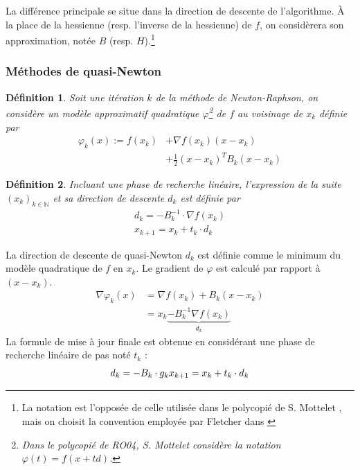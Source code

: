 \documentclass[3p, twocolumn]{elsarticle}
\newtheorem{definition}{Définition}[section]
\begin{document}
La différence principale se situe dans la direction de descente de l'algorithme. \`A la place de la hessienne (resp. l'inverse de la hessienne) de $f$, on considèrera son approximation, notée $B$ (resp. $H$).\footnote{La notation est l'opposée de celle utilisée dans le polycopié de S. Mottelet \cite{poly:mottelet2003}, mais on choisit la convention employée par Fletcher dans \cite{book:Fletcher_1987}}

\subsubsection{Méthodes de quasi-Newton}
\begin{definition}
    Soit une itération $k$ de la méthode de Newton-Raphson, on considère un modèle approximatif quadratique $\varphi$\footnote{Dans le polycopié de RO04, S. Mottelet \cite{poly:mottelet2003} considère la notation $\varphi(t) = f(x+td)$.} de $f$ au voisinage de $x_{k}$ définie par
    \begin{align}
        \varphi_k(x) := f(x_k) & + \nabla f(x_k) (x - x_k)\nonumber \\
                               & + \frac12 (x-x_k)^T B_k (x-x_k)
        \label{eq:modele-quadra-qn}
    \end{align}
\end{definition}

\begin{definition}
    Incluant une phase de recherche linéaire, l'expression de la suite $(x_k)_{k\in \mathbb{N}}$ et sa direction de descente $d_k$ est définie par
    \begin{align}
        d_k = -B_k^{-1}\cdot \nabla f(x_k)\nonumber \\
        x_{k+1} = x_k + t_k\cdot d_k
        \label{eq:suite-qn}
    \end{align}
\end{definition}

\begin{pf}
    La direction de descente de quasi-Newton $d_k$ est définie comme le minimum du modèle quadratique de $f$ en $x_k$. Le gradient de $\varphi$ est calculé par rapport à $(x - x_k)$.
    \begin{align*}
        \nabla \varphi_k(x) & =\nabla f(x_k) + B_k(x-x_k)                      \\
                            & = x_k \underbrace{- B_k^{-1}\nabla f(x_k)}_{d_k}
    \end{align*}
    La formule de mise à jour finale est obtenue en considérant une phase de recherche linéaire de pas noté $t_k$ :
    \begin{equation}
        d_k = -B_k\cdot g_k \\
        x_{k+1} = x_k + t_k\cdot d_k
    \end{equation}
\end{pf}
\end{document}
